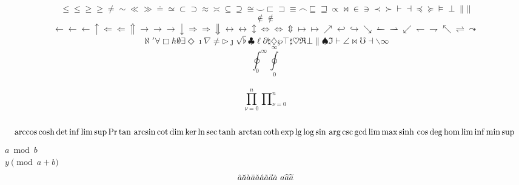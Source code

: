 \documentclass{article}
\begin{document}
	\begin{displaymath}
		\le \leq \ge \geq \neq \sim
		\ll \gg \doteq \simeq
		\subset \supset \approx \asymp
		\subseteq \supseteq \cong \smile
		\sqsubset \sqsupset \equiv \frown
		\sqsubseteq \sqsupseteq \propto \bowtie
		\in \ni \prec \succ
		\vdash \dashv \preceq \succeq
		\models \perp \parallel \mid |
	\end{displaymath}
	\begin{displaymath}
		\not\in \notin
	\end{displaymath}
	\begin{displaymath}
		\leftarrow \gets \longleftarrow \uparrow
		\Leftarrow \Longleftarrow \Uparrow
		\rightarrow \to \longrightarrow \downarrow
		\Rightarrow \Longrightarrow \Downarrow
		\leftrightarrow \longleftrightarrow \updownarrow
		\Leftrightarrow \Longleftrightarrow \Updownarrow
		\mapsto \longmapsto \nearrow
		\hookleftarrow \hookrightarrow \searrow
		\leftharpoonup \rightharpoonup \swarrow
		\leftharpoondown \rightharpoondown \nwarrow
		\rightleftharpoons \leadsto
	\end{displaymath}
	\begin{displaymath}
		\aleph \prime \forall \Box
		\hbar \emptyset \exists \Diamond
		\imath \nabla \neq \triangleright
		\jmath \surd \flat \clubsuit
		\ell \partial \natural \diamondsuit
		\wp \top \sharp \heartsuit
		\Re \bot \| \spadesuit
		\Im \vdash \angle \Join
		\mho \dashv \backslash \infty
	\end{displaymath}
	\[\oint^\infty_0 \oint\limits^\infty_0 \] \\
	\[\prod^n_{\nu=0} \prod\nolimits^n_{\nu=0} \] \\
	\begin{displaymath}
		\arccos \cosh \det \inf \limsup \Pr \tan \\
		\arcsin \cot \dim \ker \ln \sec \tanh \\
		\arctan \coth \exp \lg \log \sin \\
		\arg \csc \gcd \lim \max \sinh \\
		\cos \deg \hom \liminf \min \sup \\
	\end{displaymath}
	$ a \bmod b$ \\
	$ y \pmod{a+b}$
	\begin{displaymath}
		\hat{a} \breve{a} \grave{a} \bar{a} \\
		\check{a} \acute{a} \tilde{a} \vec{a} \\
		\dot{a} \ {a} \\
		\widehat{a} \widetilde{a} \\
	\end{displaymath}
\end{document}
